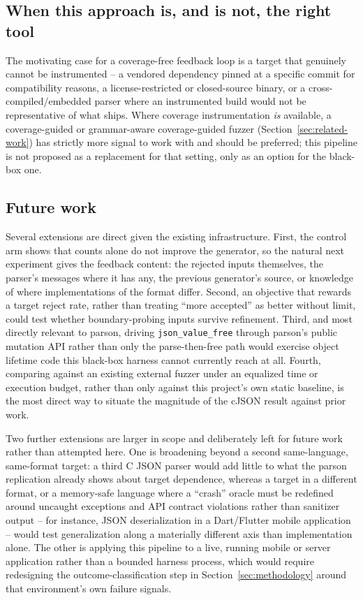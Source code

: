 \subsection{When this approach is, and is not, the right tool}
The motivating case for a coverage-free feedback loop is a target that
genuinely cannot be instrumented -- a vendored dependency pinned at a
specific commit for compatibility reasons, a license-restricted or
closed-source binary, or a cross-compiled/embedded parser where an
instrumented build would not be representative of what ships. Where
coverage instrumentation \emph{is} available, a coverage-guided or
grammar-aware coverage-guided fuzzer (Section~\ref{sec:related-work}) has
strictly more signal to work with and should be preferred; this pipeline is
not proposed as a replacement for that setting, only as an option for the
black-box one.

\subsection{Future work}
Several extensions are direct given the existing infrastructure. First,
the control arm shows that counts alone do not improve the generator, so
the natural next experiment gives the feedback content: the rejected inputs
themselves, the parser's messages where it has any, the previous
generator's source, or knowledge of where implementations of the format
differ. Second, an objective that rewards a target reject rate, rather
than treating ``more accepted'' as better without limit, could test whether
boundary-probing inputs survive refinement. Third, and most directly relevant to parson, driving
\texttt{json\_value\_free} through parson's public mutation API rather than
only the parse-then-free path would exercise object lifetime code this
black-box harness cannot currently reach at all. Fourth, comparing against
an existing external fuzzer under an equalized time or execution budget,
rather than only against this project's own static baseline, is the most
direct way to situate the magnitude of the cJSON result against prior work.

Two further extensions are larger in scope and deliberately left for future
work rather than attempted here. One is broadening beyond a second
same-language, same-format target: a third C JSON parser would add little
to what the parson replication already shows about target dependence, whereas a
target in a different format, or a memory-safe language where a
``crash'' oracle must be redefined around uncaught exceptions and API
contract violations rather than sanitizer output -- for instance, JSON
deserialization in a Dart/Flutter mobile application -- would test
generalization along a materially different axis than implementation alone.
The other is applying this pipeline to a live, running mobile or server
application rather than a bounded harness process, which would require
redesigning the outcome-classification step in
Section~\ref{sec:methodology} around that environment's own failure
signals.
